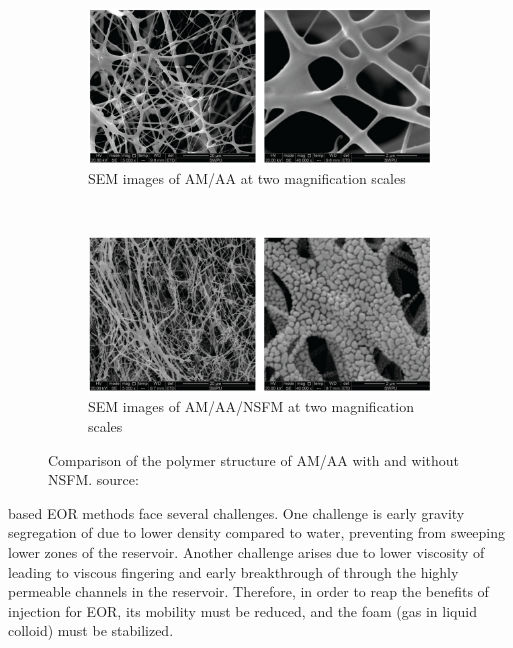 \begin{figure}
    \begin{subfigure}{\textwidth}
    \centering
    \includegraphics[width=\textwidth]{img/fig/AM-AA.png}
    \caption{SEM images of AM/AA at two magnification scales}
    \label{fig:AM-AA}
    \end{subfigure}
    \\
    \begin{subfigure}{\textwidth}
    \centering
    \includegraphics[width=\textwidth]{img/fig/AM-AA-NP.png}
    \caption{SEM images of AM/AA/NSFM at two magnification scales}
    \label{fig:AM-AA-NP}
    \end{subfigure}
    
    \caption{Comparison of the polymer structure of AM/AA with and without NSFM. source: \citet{Ye2013}}
    \label{fig:AMAANP}
\end{figure}    


 based EOR methods face several challenges. One challenge is early gravity segregation of  due to lower density compared to water, preventing  from sweeping lower zones of the reservoir. Another challenge arises due to lower viscosity of  leading to viscous fingering and early breakthrough of  through the highly permeable channels in the reservoir. Therefore, in order to reap the benefits of  injection for EOR, its mobility must be reduced, and the  foam  (gas in liquid colloid) must be stabilized. 

